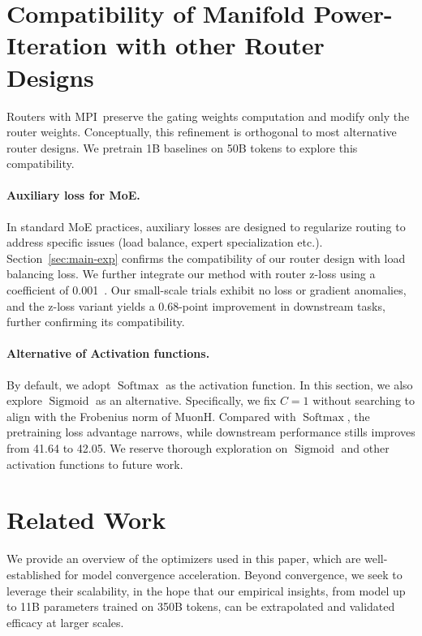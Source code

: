 \documentclass[11pt]{article}
\newcommand{\name}{MPI}
\begin{document}
\section{Compatibility of Manifold Power-\- Iteration with other Router Designs}
\label{sec:compatibility}
Routers with \name\ preserve the gating weights computation and modify only the router weights. 
Conceptually, this refinement is orthogonal to most alternative router designs.
We pretrain 1B baselines on 50B tokens to explore this compatibility.

\paragraph{Auxiliary loss for MoE.}
In standard MoE practices, auxiliary losses are designed to regularize routing to address specific issues (load balance, expert specialization etc.).
Section~\ref{sec:main-exp} confirms the compatibility of our router design with load balancing loss.
We further integrate our method with router z-loss using a coefficient of 0.001~\cite{zloss}. 
Our small-scale trials exhibit no loss or gradient anomalies, and the z-loss variant yields a 0.68-point improvement in downstream tasks, further confirming its compatibility.

\paragraph{Alternative of Activation functions.}
By default, we adopt $\operatorname{Softmax}$ as the activation function.
In this section, we also explore $\operatorname{Sigmoid}$ as an alternative.
Specifically, we fix $C=1$ without searching to align with the Frobenius norm of MuonH.
Compared with $\operatorname{Softmax}$, the pretraining loss advantage narrows, while downstream performance stills improves from 41.64 to 42.05.
We reserve thorough exploration on $\operatorname{Sigmoid}$ and other activation functions to future work.

\section{Related Work}
\label{sec:related}
We provide an overview of the optimizers used in this paper, which are well-established for model convergence acceleration.
Beyond convergence, we seek to leverage their scalability,
in the hope that our empirical insights, from model up to 11B parameters trained on 350B tokens, can be extrapolated and validated efficacy at larger scales.
\end{document}
